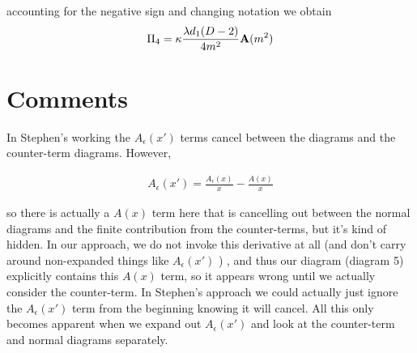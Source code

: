 \documentclass[11pt]{article}
\begin{document}
 accounting for the negative sign and changing notation we obtain
 \begin{align}
 \Pi_4 =  \kappa \frac{ \lambda d_1 (D-2)}{ 4 m^2} {\tt{\mathbf{A}}}(m^2) 
 \end{align}
 
 


 \section*{Comments}
 
 In Stephen's working the $A_{\epsilon}(x')$ terms cancel between the diagrams and the counter-term diagrams.  However,
 
 \begin{align*}
 A_{\epsilon}(x') = \frac{A_{\epsilon}(x)}{x}-\frac{A(x)}{x}
 \end{align*}
 
 so there is actually a $A(x)$ term here that is cancelling out between the normal diagrams and the finite contribution from the counter-terms, but it's kind of hidden.  In our approach, we do not invoke this derivative at all (and don't carry around non-expanded things like  $A_{\epsilon}(x')$ ) , and thus our diagram (diagram 5) explicitly contains this $A(x)$ term, so it appears wrong until we actually consider the counter-term.  In Stephen's approach we could actually just ignore the  $A_{\epsilon}(x')$  term from the beginning knowing it will cancel.  All this only becomes apparent when we expand out  $A_{\epsilon}(x')$ and look at the counter-term and normal diagrams separately.
 
 
 
 
 
 
 
 
 
\end{document}
